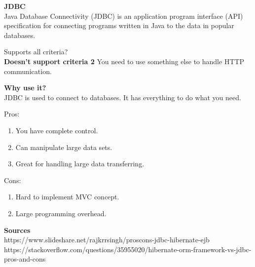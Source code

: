 		\textbf{JDBC} \\
		Java Database Connectivity (JDBC) is an application program interface (API) specification for connecting programs written in Java to the data in popular databases.
		
		Supports all criteria? \\
		\textbf{Doesn't support criteria 2}
		You need to use something else to handle HTTP communication.
		
		\textbf{Why use it?} \\
		JDBC is used to connect to databases. It has everything to do what you need.
		
		Pros:
		\begin{enumerate}
			\item You have complete control.
			\item Can manipulate large data sets.
			\item Great for handling large data transferring.
		\end{enumerate}
		Cons:
		\begin{enumerate}
			\item Hard to implement MVC concept.
			\item Large programming overhead.
		\end{enumerate}
	
	\textbf{Sources}\\
	https://www.slideshare.net/rajkrrsingh/proscons-jdbc-hibernate-ejb \\
	https://stackoverflow.com/questions/35955020/hibernate-orm-framework-vs-jdbc-pros-and-cons \\